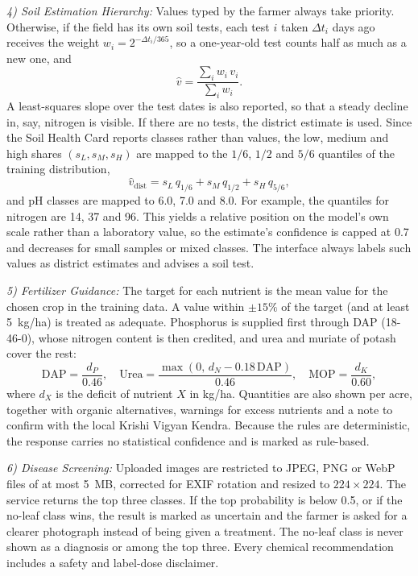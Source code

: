 \documentclass[conference]{IEEEtran}
\begin{document}
\textit{4) Soil Estimation Hierarchy:} Values typed by the farmer always take priority. Otherwise, if the field has its own soil tests, each test $i$ taken $\Delta t_i$ days ago receives the weight $w_i = 2^{-\Delta t_i / 365}$, so a one-year-old test counts half as much as a new one, and
\begin{equation}
\hat{v} = \frac{\sum_i w_i\, v_i}{\sum_i w_i}.
\label{eq:recency}
\end{equation}
A least-squares slope over the test dates is also reported, so that a steady decline in, say, nitrogen is visible. If there are no tests, the district estimate is used. Since the Soil Health Card reports classes rather than values, the low, medium and high shares $(s_L, s_M, s_H)$ are mapped to the $1/6$, $1/2$ and $5/6$ quantiles of the training distribution,
\begin{equation}
\hat{v}_{\mathrm{dist}} = s_L\, q_{1/6} + s_M\, q_{1/2} + s_H\, q_{5/6},
\label{eq:district}
\end{equation}
and pH classes are mapped to 6.0, 7.0 and 8.0. For example, the quantiles for nitrogen are 14, 37 and 96. This yields a relative position on the model's own scale rather than a laboratory value, so the estimate's confidence is capped at 0.7 and decreases for small samples or mixed classes. The interface always labels such values as district estimates and advises a soil test.

\textit{5) Fertilizer Guidance:} The target for each nutrient is the mean value for the chosen crop in the training data. A value within $\pm 15\%$ of the target (and at least 5~kg/ha) is treated as adequate. Phosphorus is supplied first through DAP (18-46-0), whose nitrogen content is then credited, and urea and muriate of potash cover the rest:
\begin{equation}
\mathrm{DAP} = \frac{d_P}{0.46},\quad
\mathrm{Urea} = \frac{\max(0,\, d_N - 0.18\,\mathrm{DAP})}{0.46},\quad
\mathrm{MOP} = \frac{d_K}{0.60},
\label{eq:fert}
\end{equation}
where $d_X$ is the deficit of nutrient $X$ in kg/ha. Quantities are also shown per acre, together with organic alternatives, warnings for excess nutrients and a note to confirm with the local Krishi Vigyan Kendra. Because the rules are deterministic, the response carries no statistical confidence and is marked as rule-based.

\textit{6) Disease Screening:} Uploaded images are restricted to JPEG, PNG or WebP files of at most 5~MB, corrected for EXIF rotation and resized to $224 \times 224$. The service returns the top three classes. If the top probability is below 0.5, or if the no-leaf class wins, the result is marked as uncertain and the farmer is asked for a clearer photograph instead of being given a treatment. The no-leaf class is never shown as a diagnosis or among the top three. Every chemical recommendation includes a safety and label-dose disclaimer.
\end{document}
